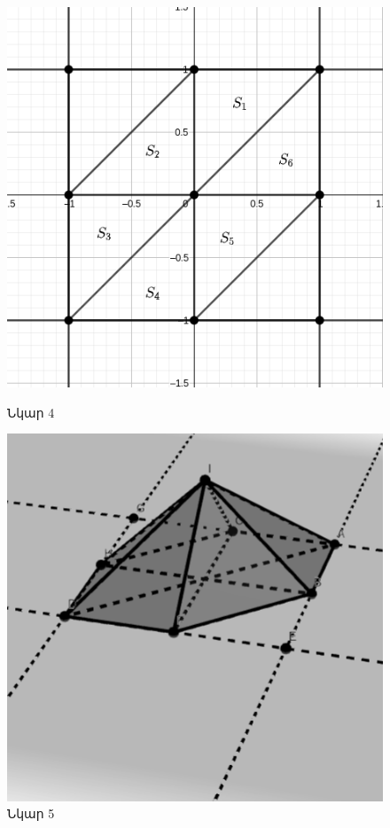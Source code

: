\documentclass[fleqn, bachelor,subf,12pt,notitlepage]{disser}
\begin{document}
\begin{figure}[h!]
  \centering
  \begin{minipage}[b]{0.4\textwidth}
    \includegraphics[width=\textwidth]{images/image_4.png}
    \captionsetup{labelformat=empty}
    \caption{Նկար 4}
  \end{minipage}
  \hfill
  \begin{minipage}[b]{0.4\textwidth}
    \includegraphics[width=\textwidth]{images/image_6.png}
    \captionsetup{labelformat=empty}
    \caption{Նկար 5}
  \end{minipage}
\end{figure}
\end{document}
